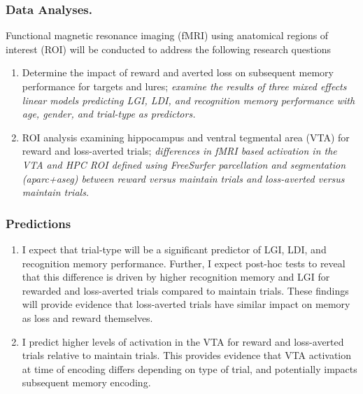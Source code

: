 \documentclass[11pt]{article}
\providecommand\citep{\cite}
\begin{document}
\subsubsection*{Data Analyses.} Functional magnetic resonance imaging (fMRI) using
anatomical regions of interest (ROI) will be conducted to address the following research
questions
\begin{enumerate}
    \item Determine the impact of reward and averted loss on subsequent memory
          performance for targets and lures; \textit{examine the results of three mixed
              effects linear models predicting LGI, LDI, and recognition memory performance with
              age, gender, and trial-type as predictors.}
    \item ROI analysis examining hippocampus and ventral tegmental area (VTA) for reward
          and loss-averted trials; \textit{differences in fMRI based activation in the
              VTA and HPC ROI defined using FreeSurfer parcellation and segmentation
              (aparc+aseg) \citep{Fischl2012} between reward versus maintain trials and
              loss-averted versus maintain
              trials.}
    
\end{enumerate}

\subsubsection*{Predictions}
\begin{enumerate}
    \item I expect that trial-type will be a significant predictor of LGI, LDI, and
          recognition memory performance. Further, I expect post-hoc tests to reveal
          that this difference is driven by higher recognition memory and LGI for
          rewarded and loss-averted trials compared to maintain trials. These findings
          will provide evidence that loss-averted trials have similar impact on memory
          as loss and reward themselves.
    \item I predict higher levels of activation in the VTA for reward and loss-averted
          trials relative to maintain trials. This provides evidence that VTA activation
          at time of encoding differs depending on type of trial, and potentially
          impacts subsequent memory encoding.
\end{enumerate}
\clearpage
{}

{}
\end{document}
